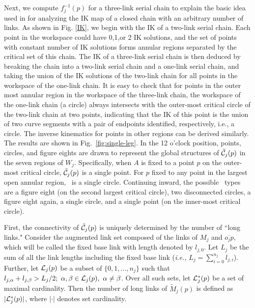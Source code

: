 Next, we compute $f_j^{-1}(p)$ for a three-link serial chain to
explain the basic idea used in \cite{MT2, MT1} for analyzing the
IK map of a closed chain with an arbitrary number of links. As
shown in Fig. \ref{IK}, we begin with the IK of a two-link serial
chain. Each point in the workspace could have 0,1,or 2 IK
solutions, and the set of points with constant number of IK
solutions forms annular regions separated by the critical set of
this chain. The IK of a three-link serial chain is then deduced by
breaking the chain into a two-link serial chain and a one-link
serial chain, and taking the union of the IK solutions of the
two-link chain for all points in the workspace of the one-link
chain. It is easy to check that for points in the outer most
annular region in the workspace of the three-link chain, the
workspace of the one-link chain (a circle) always intersects with
the outer-most critical circle of the two-link chain at two
points, indicating that the IK of this point is the union of two
curve segments with a pair of endpoints identified, respectively,
i.e., a circle. The inverse kinematics for points in other regions
can be derived similarly. The results are shown in
Fig.~\ref{fig:single-leg}. In the 12 o'clock position, points,
circles, and figure eights are drawn to represent the global
structures of $\tilde {\cal C}_j(p)$ in the seven regions of
$W_j$. Specifically, when $A$ is fixed to a point $p$ on the
outer-most critical circle, $\tilde {\cal C}_j(p)$ is a single
point. For $p$ fixed to any point in the largest open annular
region, \cspace \ is a single circle. Continuing inward, the
possible \cspace \ types are a figure eight (on the second largest
critical circle), two disconnected circles, a figure eight again,
a single circle, and a single point (on the inner-most critical
circle).

First, the connectivity of $\tilde {\cal C}_j(p)$ is uniquely
determined by the number of ``long links."  Consider the augmented
link set composed of the links of $M_j$ and $\overline {o_jp}$,
which will be called the fixed base link with length denoted by
$l_{j,0}$. Let $L_j$ be the sum of all the link lengths including
the fixed base link ({\em i.e.,} $L_j = \sum_{i=0}^{n_j}
l_{j,i}$). Further, let ${\cal L}_j(p)$ be a subset of
$\{0,1,...,n_j\}$ such that $l_{j,\alpha}+l_{j,\beta} > L_j / 2; \
\alpha,\beta \in {\cal L}_j(p), \ \alpha \neq \beta$. Over all
such sets, let ${\cal L}_j^*(p)$ be a set of maximal cardinality.
Then the number of long links of $\tilde M_j(p)$ is defined as
$|{\cal L}_j^*(p)|$, where $| \cdot |$ denotes set cardinality.

